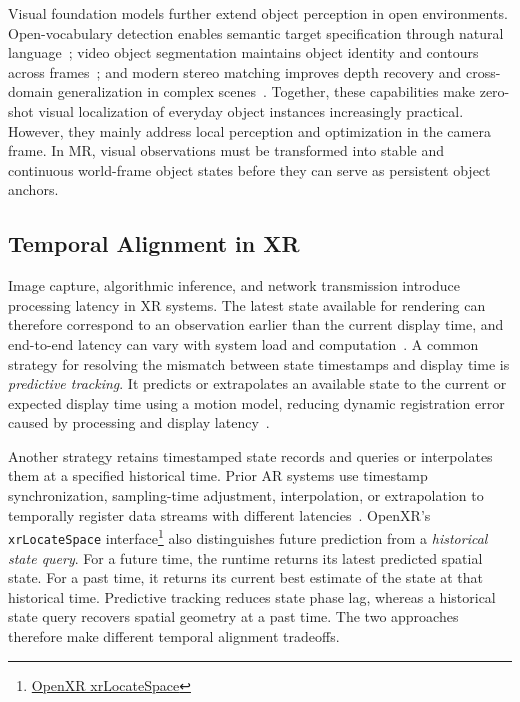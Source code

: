 \documentclass[review]{vgtc}
\begin{document}
Visual foundation models further extend object perception in open environments. Open-vocabulary detection enables semantic target specification through natural language~\cite{owlvit2022,glip2022,groundingdino2025,yoloe2025}; video object segmentation maintains object identity and contours across frames~\cite{xmem2022,cutie2024}; and modern stereo matching improves depth recovery and cross-domain generalization in complex scenes~\cite{raftstereo2021,igevstereo2023,fastfoundationstereo2026}. Together, these capabilities make zero-shot visual localization of everyday object instances increasingly practical. However, they mainly address local perception and optimization in the camera frame. In MR, visual observations must be transformed into stable and continuous world-frame object states before they can serve as persistent object anchors.

\subsection{Temporal Alignment in XR}

Image capture, algorithmic inference, and network transmission introduce processing latency in XR systems. The latest state available for rendering can therefore correspond to an observation earlier than the current display time, and end-to-end latency can vary with system load and computation~\cite{diluca2010latency,mrloop2022,stauffert2020mtp}. A common strategy for resolving the mismatch between state timestamps and display time is \emph{predictive tracking}. It predicts or extrapolates an available state to the current or expected display time using a motion model, reducing dynamic registration error caused by processing and display latency~\cite{azuma1994improving,laviola2003double,pvt2023,yoon2022headmotion}.

Another strategy retains timestamped state records and queries or interpolates them at a specified historical time. Prior AR systems use timestamp synchronization, sampling-time adjustment, interpolation, or extrapolation to temporally register data streams with different latencies~\cite{jacobs1997latency}. OpenXR's \texttt{xrLocateSpace} interface\footnote{\href{https://registry.khronos.org/OpenXR/specs/1.1/man/html/xrLocateSpace.html}{OpenXR xrLocateSpace}} also distinguishes future prediction from a \emph{historical state query}. For a future time, the runtime returns its latest predicted spatial state. For a past time, it returns its current best estimate of the state at that historical time. Predictive tracking reduces state phase lag, whereas a historical state query recovers spatial geometry at a past time. The two approaches therefore make different temporal alignment tradeoffs.
\end{document}
